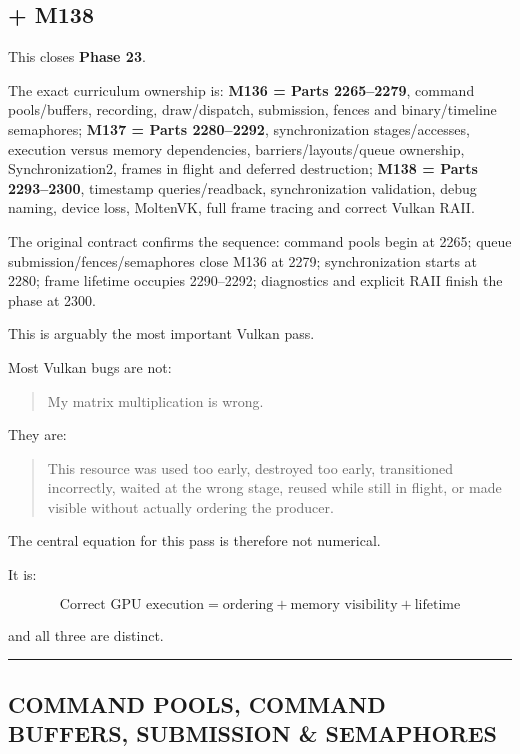 \subsection{+ M138}\label{01-foundations-i-ch014-m138}

\hypertarget{01-foundations-i-ch014-m138}{}

This closes \textbf{Phase 23}.

The exact curriculum ownership is: \textbf{M136 = Parts 2265--2279}, command pools/buffers, recording, draw/dispatch, submission, fences and binary/timeline semaphores; \textbf{M137 = Parts 2280--2292}, synchronization stages/accesses, execution versus memory dependencies, barriers/layouts/queue ownership, Synchronization2, frames in flight and deferred destruction; \textbf{M138 = Parts 2293--2300}, timestamp queries/readback, synchronization validation, debug naming, device loss, MoltenVK, full frame tracing and correct Vulkan RAII.

The original contract confirms the sequence: command pools begin at 2265; queue submission/fences/semaphores close M136 at 2279; synchronization starts at 2280; frame lifetime occupies 2290--2292; diagnostics and explicit RAII finish the phase at 2300.

This is arguably the most important Vulkan pass.

Most Vulkan bugs are not:

\begin{quote}
My matrix multiplication is wrong.
\end{quote}

They are:

\begin{quote}
This resource was used too early, destroyed too early, transitioned incorrectly, waited at the wrong stage, reused while still in flight, or made visible without actually ordering the producer.
\end{quote}

The central equation for this pass is therefore not numerical.

It is:

\[
\boxed{
\text{Correct GPU execution}
=
\text{ordering}
+
\text{memory visibility}
+
\text{lifetime}
}
\]

and all three are distinct.

\begin{center}\rule{0.5\linewidth}{0.5pt}\end{center}

\subsection{COMMAND POOLS, COMMAND BUFFERS, SUBMISSION \& SEMAPHORES}\label{01-foundations-i-ch014-command-pools-command-buffers-submission-semaphores}


